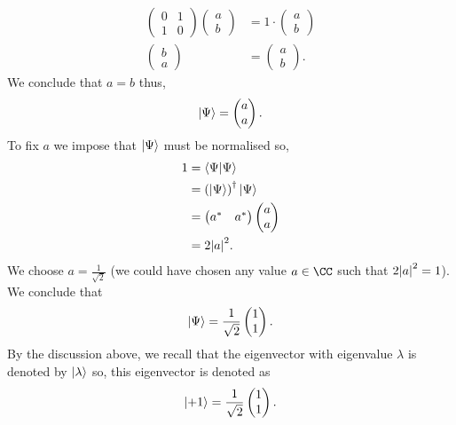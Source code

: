 \documentclass[12pt, a4paper]{article}
\begin{document}
\begin{example}
\begin{itemize}
\begin{itemize}
            \[\begin{aligned}
                \begin{pmatrix} 0 & 1 \\ 1 & 0\end{pmatrix}\begin{pmatrix} a \\b\end{pmatrix} &= 1 \cdot \begin{pmatrix} a \\b\end{pmatrix} \\
                \begin{pmatrix} b \\a\end{pmatrix} &= \begin{pmatrix} a \\b\end{pmatrix}.
            \end{aligned}\]
            We conclude that \(a=b\) thus, 
            \[\ket{\Psi} = \begin{pmatrix} a \\a\end{pmatrix}.\]
            To fix \(a\) we impose that \(\ket{\Psi}\) must be normalised so,
            \[\begin{aligned}
                1 &= \bra{\Psi}\ket{\Psi} \\
                &= \left( \ket{\Psi} \right)^{\dagger} \ket{\Psi} \\
                &= \begin{pmatrix} a^* & a^* \end{pmatrix} \begin{pmatrix} a \\a\end{pmatrix} \\
                &= 2\abs{a}^2.
            \end{aligned}\] 
            We choose \(a = \frac{1}{\sqrt{2}}\) (we could have chosen any value \(a \in \CC\) such that \(2\abs{a}^2=1\)). We conclude that 
            \[\ket{\Psi} = \frac{1}{\sqrt{2}} \begin{pmatrix} 1 \\1\end{pmatrix}.\]
            By the discussion above, we recall that the eigenvector with eigenvalue \(\lambda\) is denoted by \(\ket{\lambda}\) so, this eigenvector is denoted as 
            \[\ket{+1} =\frac{1}{\sqrt{2}} \begin{pmatrix} 1 \\1\end{pmatrix}.\]

\end{itemize}
\end{itemize}
\end{example}
\end{document}
